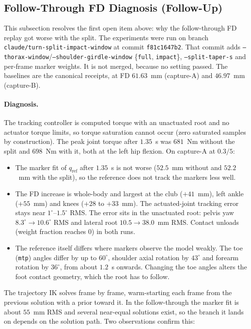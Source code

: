 \documentclass[11pt,a4paper]{article}
\begin{document}
\subsection{Follow-Through FD Diagnosis (Follow-Up)}
\label{sec:turn_split_fd}
This subsection resolves the first open item above: why the follow-through FD replay got worse with the split. The experiments were run on branch \texttt{claude/turn-split-impact-window} at commit \texttt{f81c1647b2}. That commit adds \texttt{--thorax-window}/\texttt{--shoulder-girdle-window} \{\texttt{full}, \texttt{impact}\}, \texttt{--split-taper-s} and per-frame marker weights. It is not merged, because no setting passed. The baselines are the canonical receipts, at FD $61.63$~mm (capture-A) and $46.97$~mm (capture-B).

\paragraph{Diagnosis.} The tracking controller is computed torque with an unactuated root and no actuator torque limits, so torque saturation cannot occur (zero saturated samples by construction). The peak joint torque after $1.35$~s was $681$~Nm without the split and $698$~Nm with it, both at the left hip flexion. On capture-A at $0.3/5$:
\begin{itemize}
\item The marker fit of $q_{\mathrm{ref}}$ after $1.35$~s is not worse ($52.5$~mm without and $52.2$~mm with the split), so the reference does not track the markers less well.
\item The FD increase is whole-body and largest at the club ($+41$~mm), left ankle ($+55$~mm) and knees ($+28$ to $+33$~mm). The actuated-joint tracking error stays near $1^\circ$--$1.5^\circ$ RMS. The error sits in the unactuated root: pelvis yaw $8.3^\circ\to10.6^\circ$ RMS and lateral root $10.5\to38.0$~mm RMS. Contact unloads (weight fraction reaches $0$) in both runs.
\item The reference itself differs where markers observe the model weakly. The toe (\texttt{mtp}) angles differ by up to $60^\circ$, shoulder axial rotation by $43^\circ$ and forearm rotation by $36^\circ$, from about $1.2$~s onwards. Changing the toe angles alters the foot contact geometry, which the root has to follow.
\end{itemize}
The trajectory IK solves frame by frame, warm-starting each frame from the previous solution with a prior toward it. In the follow-through the marker fit is about $55$~mm RMS and several near-equal solutions exist, so the branch it lands on depends on the solution path. Two observations confirm this:
\end{document}
